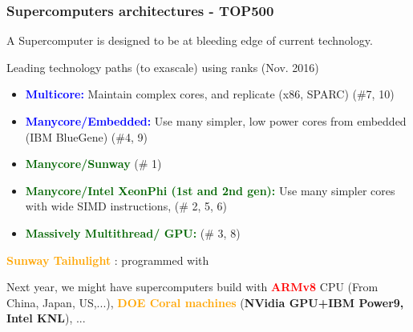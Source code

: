 \begin{frame}
  \frametitle{Supercomputers architectures - TOP500}

  A Supercomputer is designed to be at bleeding edge of current technology.

  { Leading technology paths (to exascale) using  ranks (Nov. 2016)}
  \begin{itemize}
  \item \textcolor{blue}{\textbf{Multicore:}} Maintain complex cores, and replicate (x86, SPARC) (\#7, 10)
  \item \textcolor{blue}{\textbf{Manycore/Embedded:}} Use many simpler, low power cores from embedded (IBM BlueGene) (\#4, 9)
  \item \textcolor{darkgreen}{\textbf{Manycore/Sunway}} (\# 1)
  \item \textcolor{darkgreen}{\textbf{Manycore/Intel XeonPhi (1st and 2nd gen):}} Use many simpler cores with wide SIMD instructions, (\# 2, 5, 6)
  \item \textcolor{darkgreen}{\textbf{Massively Multithread/ GPU:}}  (\# 3, 8)
  \end{itemize}

  \textcolor{orange}{\textbf{Sunway Taihulight}} : programmed with 

  Next year, we might have supercomputers build with \textcolor{red}{\textbf{ARMv8}} CPU (From China, Japan, US,...), \textcolor{orange}{\textbf{DOE Coral machines}} (\textbf{NVidia GPU+IBM Power9, Intel KNL}), ...

\end{frame}

